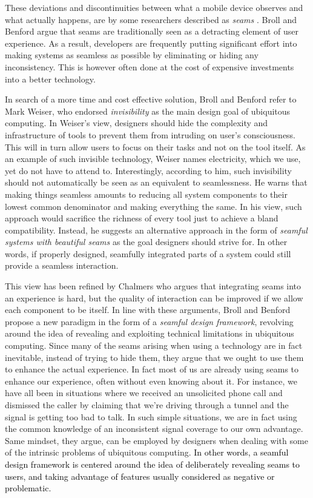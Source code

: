 \documentclass[prodmode,acmtomm]{acmsmall}
\begin{document}
These deviations and discontinuities between what a mobile device observes and what actually happens, are by some researchers described as \textit{seams} \cite{weiser1993}. Broll and Benford \cite{benford2005} argue that seams are traditionally seen as a detracting element of user experience. As a result, developers are frequently putting significant effort into making systems as seamless as possible by eliminating or hiding any inconsistency. This is however often done at the cost of expensive investments into a better technology. 

In search of a more time and cost effective solution, Broll and Benford \cite{benford2005} refer to Mark Weiser, who endorsed \textit{invisibility} as the main design goal of ubiquitous computing.\cite{weiser1993} In Weiser’s view, designers should hide the complexity and infrastructure of tools to prevent them from intruding on user's consciousness. This will in turn allow users to focus on their tasks and not on the tool itself. As an example of such invisible technology, Weiser  names electricity, which we use, yet do not have to attend to. Interestingly, according to him, such invisibility should not automatically be seen as an equivalent to seamlessness. He warns that making things seamless amounts to reducing all system components to their lowest common denominator and making everything the same. In his view, such approach would sacrifice the richness of every tool just to achieve a bland compatibility. Instead, he suggests an alternative approach in the form of \textit{seamful systems with beautiful seams} as the goal designers should strive for. In other words, if properly designed, seamfully integrated parts of a system could still provide a seamless interaction. 

This view has been refined by Chalmers \cite{chalmers2003} who argues that integrating seams into an experience is hard, but the quality of interaction can be improved if we allow each component to be itself. In line with these arguments, Broll and Benford \cite{benford2005} propose a new paradigm in the form of a \textit{seamful design framework}, revolving around the idea of revealing and exploiting technical limitations in ubiquitous computing. Since many of the seams arising when using a technology are in fact inevitable, instead of trying to hide them, they argue that we ought to use them to enhance the actual experience. In fact most of us are already using seams to enhance our experience, often without even knowing about it. For instance, we have all been in situations where we received an unsolicited phone call and dismissed the caller by claiming that we're driving through a tunnel and the signal is getting too bad to talk. In such simple situations, we are in fact using the common knowledge of an inconsistent signal coverage to our own advantage. Same mindset, they argue, can be employed by designers when dealing with some of the intrinsic problems of ubiquitous computing. \textcolor{black}{In other words, a seamful design framework is centered around the idea of deliberately revealing seams to users, and taking advantage of features usually considered as negative or problematic.\cite{chalmers2003}} 
\end{document}
